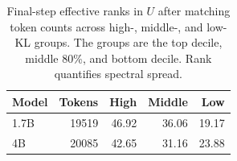 \begin{table}[t]
\centering
\caption{Final-step effective ranks in $U$ after matching token counts across high-, middle-, and low-KL groups. The groups are the top decile, middle 80\%, and bottom decile. Rank quantifies spectral spread.}
\label{tab:matched}
\small
\setlength{\tabcolsep}{3pt}
\begin{tabular}{lrrrr}
\toprule
Model & Tokens & High & Middle & Low \\
\midrule
1.7B & 19519 & 46.92 & 36.06 & 19.17 \\
4B & 20085 & 42.65 & 31.16 & 23.88 \\
\bottomrule
\end{tabular}
\end{table}
